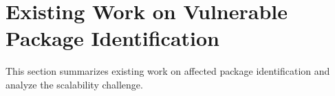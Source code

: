 








\section{Existing Work on Vulnerable Package Identification\label{sec: scale}}

This section summarizes existing work on affected package identification and analyze the scalability challenge. 

